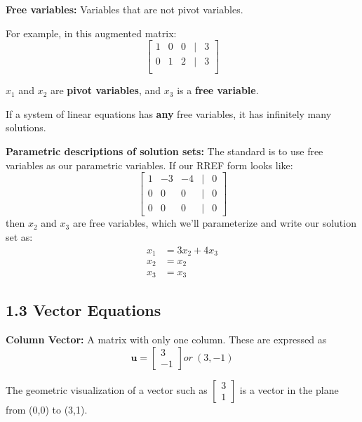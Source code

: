 \documentclass[12pt]{article}
\newcommand{\definition}[2]{
  \noindent\textbf{#1:} #2
}
\begin{document}
\definition{Free variables}{Variables that are not pivot variables.}

For example, in this augmented matrix:
\[
    \begin{bmatrix}
    
    1 & 0 & 0 & \vert & 3 \\
    0 & 1 & 2 & \vert & 3 \\

    \end{bmatrix}
\]

$x_1$ and $x_2$ are \textbf{pivot variables}, and $x_3$ is a \textbf{free variable}.


\begin{note}
    If a system of linear equations has \textbf{any} free variables, it has infinitely many solutions.
\end{note}

\definition{Parametric descriptions of solution sets}{
    The standard is to use free variables as our parametric variables. If our RREF form looks like:
    \[
    \begin{bmatrix}
        1 & -3 & -4 & \vert & 0 \\
        0 & 0 & 0 & \vert & 0 \\
        0 & 0 & 0 & \vert & 0
    \end{bmatrix}
    \]
    then $x_2$ and $x_3$ are free variables, which we'll parameterize and write our solution set as:
    \[
    \begin{aligned}
        x_1 & = 3x_2 + 4x_3 \\
        x_2 & = x_2 \\
        x_3 & = x_3
    \end{aligned}
    \]
}

\subsection*{1.3 Vector Equations}
\definition{Column Vector}{A matrix with only one column. These are expressed as 
\[
\textbf{u} = \begin{bmatrix} 3\\-1 \end{bmatrix}
or\ (3, -1)
\]}

The geometric visualization of a vector such as $\begin{bmatrix} 3\\1 \end{bmatrix}$ is a vector in the plane from (0,0) to (3,1).
\end{document}
